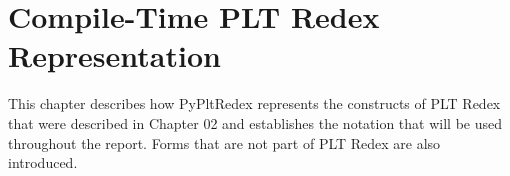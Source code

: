\chapter{Compile-Time PLT Redex Representation}
\label{chapter05}

This chapter describes how PyPltRedex represents the constructs of PLT Redex  that were described in Chapter 02 and establishes the notation that will be used throughout the report. Forms that are not part of PLT Redex are also introduced.





%
